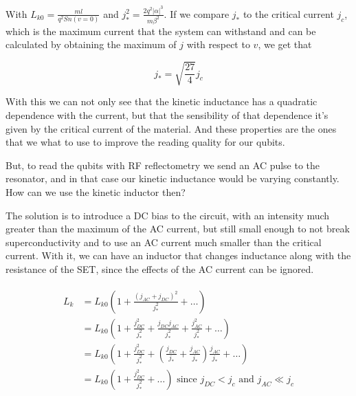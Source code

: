 \documentclass[../main.tex]{subfiles}
\begin{document}
With \(L_{k0} = \frac{ml}{q^2Sn(v=0)}\) and \(j_{*}^2 =
\frac{2q^2|\alpha|^3}{m\beta^2}\). If we compare \(j_{*}\)
to the critical current \(j_{c}\), which is the maximum current that
the system can withstand and can be calculated by obtaining the maximum of
\(j\) with respect to \(v\), we get that

\begin{equation}
\label{eq:NonLinearityConstant}
    j_{*} = \sqrt{\frac{27}{4}}j_{c}
\end{equation}

With this we can not only see that the kinetic inductance has a quadratic
dependence with the current, but that the sensibility of that dependence it's
given by the critical current of the material. And these properties are the
ones that we what to use to improve the reading quality for our qubits.

But, to read the qubits with RF reflectometry we send an AC pulse to the
resonator, and in that case our kinetic inductance would be varying constantly.
How can we use the kinetic inductor then?

The solution is to introduce a DC bias to the circuit, with an intensity much
greater than the maximum of the AC current, but still small enough to not break
superconductivity and to use an AC current much smaller than the critical current.
With it, we can have an inductor that changes inductance along with the resistance
of the SET, since the effects of the AC current can be ignored.

\begin{align}
\begin{split}
\label{eq:KineticNonLinealityACDC}
L_{k} &= L_{k0}\left(1 + \frac{(j_{AC} + j_{DC})^2}{j_{*}^2} + \dots\right)\\
      &= L_{k0}\left(1 + \frac{j_{DC}^2}{j_{*}^2} + \frac{j_{DC}j_{AC}}{j_{*}^2} + 
      \frac{j_{AC}^2}{j_{*}^2} + \dots\right)\\
      &= L_{k0}\left(1 + \frac{j_{DC}^2}{j_{*}^2} + (\frac{j_{DC}}{j_{*}} + 
      \frac{j_{AC}}{j_{*}})\frac{j_{AC}}{j_{*}} + \dots\right)\\
      &= L_{k0}\left(1 + \frac{j_{DC}^2}{j_{*}^2} + \dots\right)
      \text{ since \(j_{DC} < j_{c}\) and \(j_{AC} \ll j_{c}\)}
\end{split}
\end{align}
\end{document}
